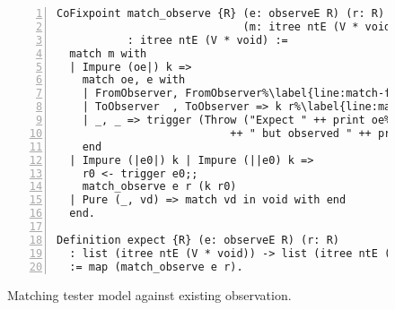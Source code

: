 \begin{figure}
\begin{lstlisting}[style=customcoq,numbers=left,escapechar=\%]
CoFixpoint match_observe {R} (e: observeE R) (r: R)
                             (m: itree ntE (V * void))
           : itree ntE (V * void) :=
  match m with
  | Impure (oe|) k =>
    match oe, e with
    | FromObserver, FromObserver%\label{line:match-from}%
    | ToObserver  , ToObserver => k r%\label{line:match-to}%
    | _, _ => trigger (Throw ("Expect " ++ print oe%\label{line:match-throw}%
                           ++ " but observed " ++ print e))
    end
  | Impure (|e0|) k | Impure (||e0) k =>
    r0 <- trigger e0;;
    match_observe e r (k r0)
  | Pure (_, vd) => match vd in void with end
  end.

Definition expect {R} (e: observeE R) (r: R)
  : list (itree ntE (V * void)) -> list (itree ntE (V * void))
  := map (match_observe e r).
\end{lstlisting}
\caption{Matching tester model against existing observation.}
\label{fig:match-observe}
\end{figure}

